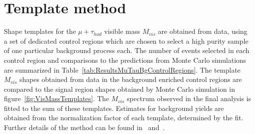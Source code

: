 \section{Template method}
\label{sec:template}
%
Shape templates for the $\mu + \tau_{had}$ visible mass $M_{vis}$ are obtained
from data, using a set of dedicated control regions which are chosen to select a
high purity sample of one particular background process each.  The number of
events selected in each control region and comparisons to the predictions from
Monte Carlo simulations are summarized in
Table~\ref{tab:ResultsMuTauBgControlRegions}.  The template $M_{vis}$ shapes
obtained from data in the background enriched control regions are compared to
the signal region shapes obtained by Monte Carlo simulation in
figure~\ref{fig:VisMassTemplates}.  The $M_{vis}$ spectrum observed in the final
analysis is fitted to the sum of these templates.  Estimates for background
yields are obtained from the normalization factor of each template, determined
by the fit.  Further details of the method can be found
in~\cite{CMS_AN_2010-088} and~\cite{CMS_AN_2011-021}. 
%
